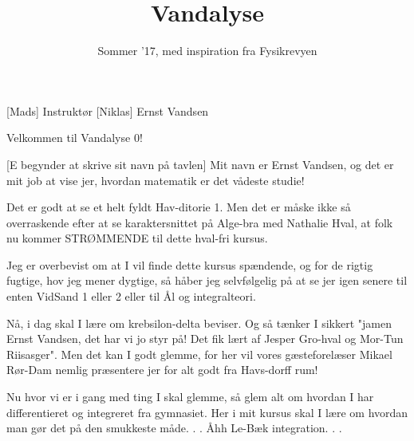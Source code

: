 \documentclass[a4paper,11pt]{article}
\title{Vandalyse}
\author{Sommer '17, med inspiration fra Fysikrevyen}
\begin{document}
\maketitle

\begin{roles}
[Mads] Instruktør
[Niklas] Ernst Vandsen
\end{roles}


\begin{sketch}


 Velkommen til Vandalyse 0!

[E begynder at skrive sit navn på tavlen] Mit navn er Ernst Vandsen, og det er mit job at vise jer, hvordan matematik er det vådeste studie!

 Det er godt at se et helt fyldt Hav-ditorie 1. Men det er måske ikke så overraskende efter at se karaktersnittet på Alge-bra med Nathalie Hval, at folk nu kommer STRØMMENDE til dette hval-fri kursus.

 Jeg er overbevist om at I vil finde dette kursus spændende, og for de rigtig fugtige, hov jeg mener dygtige, så håber jeg selvfølgelig på at se jer igen senere til enten VidSand 1 eller 2 eller til Ål og integralteori.

 Nå, i dag skal I lære om krebsilon-delta beviser. Og så tænker I sikkert "jamen Ernst Vandsen, det har vi jo styr på! Det fik lært af Jesper Gro-hval og Mor-Tun Riisasger". Men det kan I godt glemme, for her vil vores gæsteforelæser Mikael Rør-Dam nemlig præsentere jer for alt godt fra Havs-dorff rum!

 Nu hvor vi er i gang med ting I skal glemme, så glem alt om hvordan I har differentieret og integreret fra gymnasiet. Her i mit kursus skal I lære om hvordan man gør det på den smukkeste måde. . . Åhh Le-Bæk integration. . .

\end{sketch}
\end{document}
